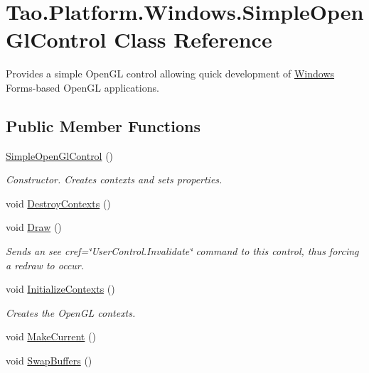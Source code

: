 \hypertarget{class_tao_1_1_platform_1_1_windows_1_1_simple_open_gl_control}{
\section{Tao.Platform.Windows.SimpleOpenGlControl Class Reference}
\label{class_tao_1_1_platform_1_1_windows_1_1_simple_open_gl_control}
}


Provides a simple OpenGL control allowing quick development of \hyperlink{namespace_tao_1_1_platform_1_1_windows}{Windows} Forms-\/based OpenGL applications.  


\subsection*{Public Member Functions}
\begin{DoxyCompactItemize}
\item 
\hyperlink{class_tao_1_1_platform_1_1_windows_1_1_simple_open_gl_control_a1720605091a74a240ca937e611ba8392}{SimpleOpenGlControl} ()
\begin{DoxyCompactList}\small\item\em Constructor. Creates contexts and sets properties. \item\end{DoxyCompactList}\item 
void \hyperlink{class_tao_1_1_platform_1_1_windows_1_1_simple_open_gl_control_acb7e59da86224fa5e278d9cc95b7cd6d}{DestroyContexts} ()
\item 
void \hyperlink{class_tao_1_1_platform_1_1_windows_1_1_simple_open_gl_control_a692cbdda435a63a9c398317fcea00ec0}{Draw} ()
\begin{DoxyCompactList}\small\item\em Sends an see cref=\char`\"{}UserControl.Invalidate\char`\"{} command to this control, thus forcing a redraw to occur. \item\end{DoxyCompactList}\item 
void \hyperlink{class_tao_1_1_platform_1_1_windows_1_1_simple_open_gl_control_ab4aa0873afca1ecd37a2c20f1dd2aa30}{InitializeContexts} ()
\begin{DoxyCompactList}\small\item\em Creates the OpenGL contexts. \item\end{DoxyCompactList}\item 
void \hyperlink{class_tao_1_1_platform_1_1_windows_1_1_simple_open_gl_control_ad62297e54d9182727ddb3fb0d0a39225}{MakeCurrent} ()
\item 
void \hyperlink{class_tao_1_1_platform_1_1_windows_1_1_simple_open_gl_control_a4cbd2c3a3fee355e0f2c841c1d78edc5}{SwapBuffers} ()
\end{DoxyCompactItemize}
